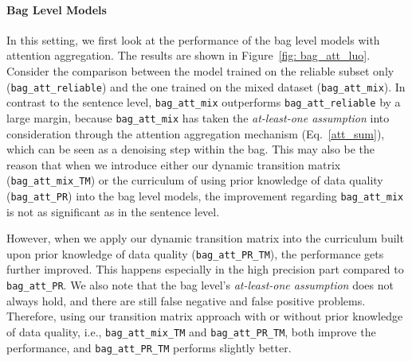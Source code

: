 \paragraph{Bag Level Models}
In this setting, we first look at the performance of the bag level models with attention aggregation. The results are shown in Figure~\ref{fig: bag_att_luo}.
Consider the comparison between the  model trained on the reliable subset only (\texttt{bag\_att\_reliable}) and the one trained on the mixed dataset (\texttt{bag\_att\_mix}).
In contrast to the sentence level, \texttt{bag\_att\_mix} outperforms \texttt{bag\_att\_reliable} by a large margin, because \texttt{bag\_att\_mix} has taken the \textit{at-least-one assumption} into consideration through the attention aggregation mechanism (Eq.~\ref{att_sum}), which can be seen as a denoising step within the bag.
This may also be the reason that when we introduce either our dynamic transition matrix (\texttt{bag\_att\_mix\_TM})  or the curriculum of using prior knowledge of data quality (\texttt{bag\_att\_PR}) into the bag level models, the improvement regarding \texttt{bag\_att\_mix}  is not as significant as in the sentence level.

However, when we apply our dynamic transition matrix %
into the curriculum built upon prior knowledge of data quality (\texttt{bag\_att\_PR\_TM}), the performance gets further improved. This happens especially in the high precision part compared to \texttt{bag\_att\_PR}.
We also note that the bag level's \textit{at-least-one assumption} does not always hold, and there are still false negative and false positive problems. Therefore, using our transition matrix approach with or without prior knowledge of data quality, i.e., \texttt{bag\_att\_mix\_TM}  and \texttt{bag\_att\_PR\_TM}, both improve the performance, and \texttt{bag\_att\_PR\_TM} performs slightly better.


